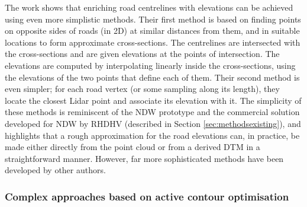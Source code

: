 The work \cite{cai_rasdorf_2008} shows that enriching road centrelines with elevations can be achieved using even more simplistic methods. Their first method is based on finding points on opposite sides of roads (in 2D) at similar distances from them, and in suitable locations to form approximate cross-sections. The centrelines are intersected with the cross-sections and are given elevations at the points of intersection. The elevations are computed by interpolating linearly inside the cross-sections, using the elevations of the two points that define each of them. Their second method is even simpler; for each road vertex  (or some sampling along its length), they locate the closest Lidar point and associate its elevation with it. The simplicity of these methods is reminiscent of the NDW prototype and the commercial solution developed for NDW by RHDHV (described in Section \ref{sec:methodsexisting}), and highlights that a rough approximation for the road elevations can, in practice, be made either directly from the point cloud or from a derived DTM in a straightforward manner. However, far more sophisticated methods have been developed by other authors.

\subsubsection{Complex approaches based on active contour optimisation}

